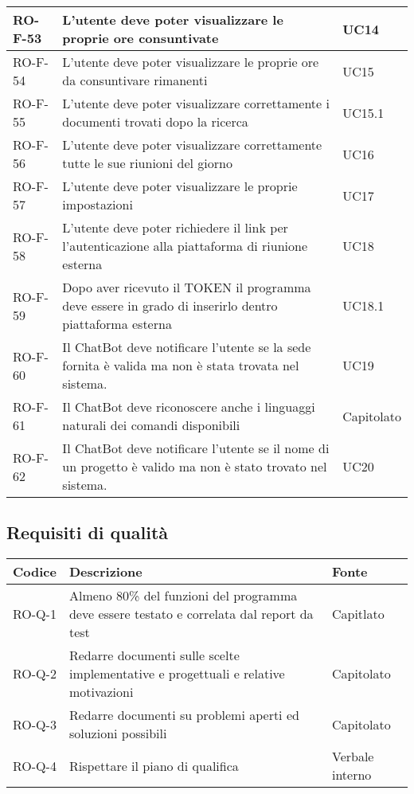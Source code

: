 \begin{center}
\begin{tabular}{ | m{8em} | m{18em} | m{12em} | }
\hline
RO-F-53&L’utente deve poter visualizzare le proprie ore consuntivate &UC14 \\
\hline
RO-F-54&L’utente deve poter visualizzare le proprie ore da consuntivare rimanenti &UC15 \\
\hline
RO-F-55&L’utente deve poter visualizzare correttamente i documenti trovati dopo la ricerca &UC15.1 \\
\hline
RO-F-56&L’utente deve poter visualizzare correttamente tutte le sue riunioni del giorno & UC16\\
\hline
RO-F-57&L’utente deve poter visualizzare le proprie impostazioni &UC17 \\
\hline
RO-F-58&L’utente deve poter richiedere il link per l’autenticazione alla piattaforma di riunione esterna &UC18 \\
\hline
RO-F-59&Dopo aver ricevuto il TOKEN il programma deve essere in grado di inserirlo dentro piattaforma esterna &UC18.1 \\
\hline
RO-F-60&Il ChatBot deve notificare l'utente se la sede fornita è valida ma non è stata trovata nel sistema.&UC19 \\
\hline
RO-F-61&Il ChatBot deve riconoscere anche i linguaggi naturali dei comandi disponibili &Capitolato \\
\hline
RO-F-62&Il ChatBot deve notificare l'utente se il nome di un progetto è valido ma non è stato trovato nel sistema. &UC20 \\
\hline
\end{tabular}
\end{center}
\newpage

\subsection{Requisiti di qualità}
\begin{center}
\renewcommand{\arraystretch}{1.8} %
\begin{tabular}{ | m{8em} | m{18em} | m{12em} | }
\hline
Codice&Descrizione&Fonte\\
\hline
RO-Q-1&Almeno 80\% del funzioni del programma deve essere testato e correlata dal report da test&Capitlato\\
\hline
RO-Q-2&Redarre documenti sulle scelte implementative e progettuali e relative motivazioni&Capitolato\\
\hline
RO-Q-3&Redarre documenti su problemi aperti ed soluzioni possibili&Capitolato\\
\hline
RO-Q-4&Rispettare il piano di qualifica&Verbale interno\\
\hline
\end{tabular}
\end{center}

